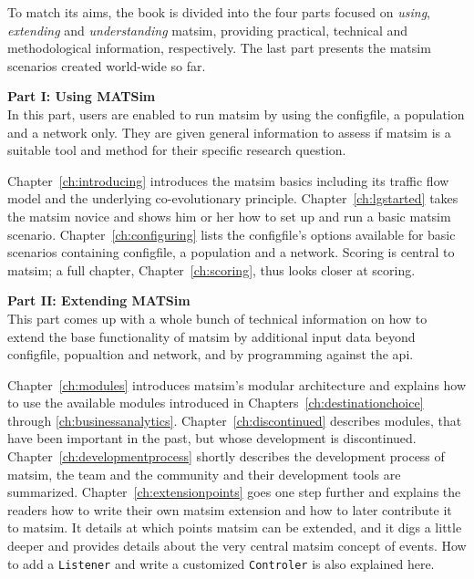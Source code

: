 To match its aims, the book is divided into the four parts focused on \emph{using}, \emph{extending} and \emph{understanding} \gls{matsim}, providing practical, technical and methodological information, respectively. The last part presents the \gls{matsim} scenarios created world-wide so far. %

\textbf{Part I: Using MATSim} \\
In this part, users are enabled to run \gls{matsim} by using the \gls{configfile}, a population and a network only. They are given general information to assess if \gls{matsim} is a suitable tool and method for their specific research question.

Chapter~\ref{ch:introducing} introduces the \gls{matsim} basics including its traffic flow model and the underlying co-evolutionary principle. 
Chapter~\ref{ch:lgstarted} takes the \gls{matsim} novice and shows him or her how to set up and run a basic \gls{matsim} \gls{scenario}. 
Chapter~\ref{ch:configuring} lists the \gls{configfile}'s options available for basic scenarios containing \gls{configfile}, a population and a network.  
Scoring is central to \gls{matsim}; a full chapter, Chapter~\ref{ch:scoring}, thus looks closer at scoring. 

\textbf{Part II: Extending MATSim} \\
This part comes up with a whole bunch of technical information on how to extend the base functionality of \gls{matsim} by additional input data beyond \gls{configfile}, popualtion and network, and by programming against the \gls{api}. 

Chapter~\ref{ch:modules} introduces \gls{matsim}'s modular architecture and explains how to use the available \glspl{module} introduced in Chapters~\ref{ch:destinationchoice} through \ref{ch:businessanalytics}. Chapter~\ref{ch:discontinued} describes modules, that have been important in the past, but whose development is discontinued.
Chapter~\ref{ch:developmentprocess} shortly describes the development process of \gls{matsim}, \ie the team and the community and their development tools are summarized. 
Chapter~\ref{ch:extensionpoints} goes one step further and explains the readers how to write their own \gls{matsim} \gls{extension} and how to later contribute it to \gls{matsim}. It details at which points \gls{matsim} can be extended, and it digs a little deeper and provides details about the very central \gls{matsim} concept of \glspl{event}. How to add a \lstinline|Listener| and write a customized \lstinline|Controler| is also explained here.

